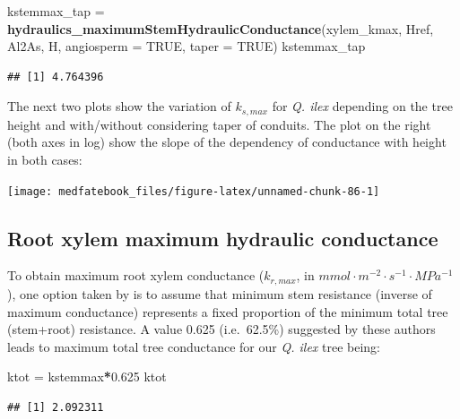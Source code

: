 \documentclass[]{book}
\newenvironment{Shaded}{\begin{snugshade}}{\end{snugshade}}
\newcommand{\KeywordTok}[1]{\textcolor[rgb]{0.13,0.29,0.53}{\textbf{#1}}}
\newcommand{\DataTypeTok}[1]{\textcolor[rgb]{0.13,0.29,0.53}{#1}}
\newcommand{\FloatTok}[1]{\textcolor[rgb]{0.00,0.00,0.81}{#1}}
\newcommand{\StringTok}[1]{\textcolor[rgb]{0.31,0.60,0.02}{#1}}
\newcommand{\OtherTok}[1]{\textcolor[rgb]{0.56,0.35,0.01}{#1}}
\newcommand{\OperatorTok}[1]{\textcolor[rgb]{0.81,0.36,0.00}{\textbf{#1}}}
\newcommand{\NormalTok}[1]{#1}
\begin{document}
\begin{Shaded}
\begin{Highlighting}[]
\NormalTok{kstemmax_tap =}\StringTok{ }\KeywordTok{hydraulics_maximumStemHydraulicConductance}\NormalTok{(xylem_kmax, }
\NormalTok{                      Href, Al2As, H, }\DataTypeTok{angiosperm =} \OtherTok{TRUE}\NormalTok{, }\DataTypeTok{taper =} \OtherTok{TRUE}\NormalTok{)}
\NormalTok{kstemmax_tap}
\end{Highlighting}
\end{Shaded}

\begin{verbatim}
## [1] 4.764396
\end{verbatim}

The next two plots show the variation of \(k_{s,max}\) for \emph{Q. ilex} depending on the tree height and with/without considering taper of conduits. The plot on the right (both axes in log) show the slope of the dependency of conductance with height in both cases:

\begin{center}\texttt{[image: medfatebook\_files/figure-latex/unnamed-chunk-86-1]} \end{center}

\hypertarget{root-xylem-maximum-hydraulic-conductance}{%
\subsection{Root xylem maximum hydraulic conductance}\label{root-xylem-maximum-hydraulic-conductance}}

To obtain maximum root xylem conductance (\(k_{r, max}\), in \(mmol \cdot m^{-2} \cdot s^{-1} \cdot MPa^{-1}\)), one option taken by \citet{Christoffersen2016} is to assume that minimum stem resistance (inverse of maximum conductance) represents a fixed proportion of the minimum total tree (stem+root) resistance. A value 0.625 (i.e.~62.5\%) suggested by these authors leads to maximum total tree conductance for our \emph{Q. ilex} tree being:

\begin{Shaded}
\begin{Highlighting}[]
\NormalTok{ktot =}\StringTok{ }\NormalTok{kstemmax}\OperatorTok{*}\FloatTok{0.625}
\NormalTok{ktot}
\end{Highlighting}
\end{Shaded}

\begin{verbatim}
## [1] 2.092311
\end{verbatim}
\end{document}
